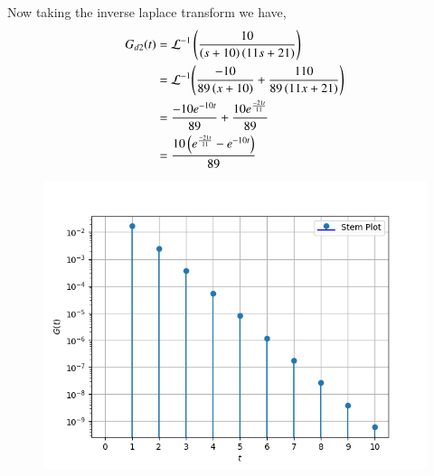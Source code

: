\documentclass[journal,12pt,onecolumn]{IEEEtran}
\theoremstyle{remark}
\begin{document}
Now taking the inverse laplace transform we have,
\begin{align}
G_{d2}(t) &= \mathcal{L}^{-1}\left(\frac{10}{\left(s+10\right)\left(11s+21\right)}\right) \\
&=\mathcal{L}^{-1}{\left(\frac{-10}{89\left(x+10\right)} + \frac{110}{89\left(11x+21\right)}\right)} \\
&= \frac{-10e^{-10t}}{89} + \frac{10e^{\frac{-21t}{11}}}{89} \\
&= \frac{10\left(e^{\frac{-21t}{11}}-e^{-10t}\right)}{89}
\end{align}

\begin{figure}[h]
    \centering
     \includegraphics[width=\columnwidth]{./figs/g44fig1.png}
    \caption{}    
    \label{fig:ishitha.g23.ch.44.f1}
\end{figure}
\end{document}
